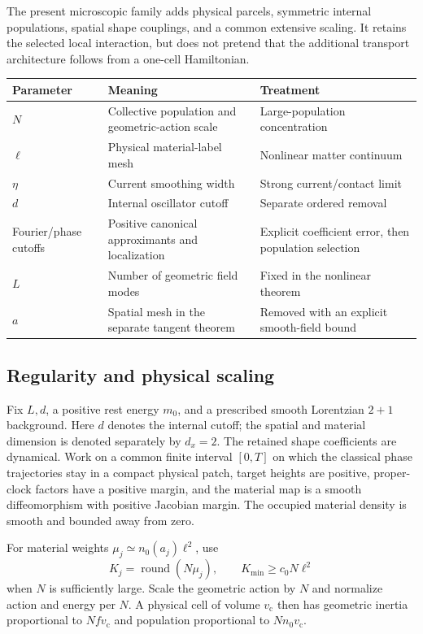 \documentclass[11pt]{article}
\begin{document}
The present microscopic family adds physical parcels, symmetric internal populations, spatial shape couplings, and a common extensive scaling. It retains the selected local interaction, but does not pretend that the additional transport architecture follows from a one-cell Hamiltonian.

\begin{center}\small
\begin{tabular}{@{}>{\raggedright\arraybackslash}p{}>{\raggedright\arraybackslash}p{}>{\raggedright\arraybackslash}p{}@{}}
\toprule
Parameter & Meaning & Treatment\\\midrule
$N$ & Collective population and geometric-action scale & Large-population concentration\\
$\ell$ & Physical material-label mesh & Nonlinear matter continuum\\
$\eta$ & Current smoothing width & Strong current/contact limit\\
$d$ & Internal oscillator cutoff & Separate ordered removal\\
Fourier/phase cutoffs & Positive canonical approximants and localization & Explicit coefficient error, then population selection\\
$L$ & Number of geometric field modes & Fixed in the nonlinear theorem\\
$a$ & Spatial mesh in the separate tangent theorem & Removed with an explicit smooth-field bound\\\bottomrule
\end{tabular}
\end{center}

\subsection{Regularity and physical scaling}
Fix $L,d$, a positive rest energy $m_0$, and a prescribed smooth Lorentzian $2+1$ background. Here $d$ denotes the internal cutoff; the spatial and material dimension is denoted separately by $d_x=2$. The retained shape coefficients are dynamical. Work on a common finite interval $[0,T]$ on which the classical phase trajectories stay in a compact physical patch, target heights are positive, proper-clock factors have a positive margin, and the material map is a smooth diffeomorphism with positive Jacobian margin. The occupied material density is smooth and bounded away from zero.

For material weights $\mu_j\simeq n_0(a_j)\ell^2$, use
\[
K_j=\operatorname{round}(N\mu_j),\qquad
K_{\min}\ge c_0N\ell^2
\]
when $N$ is sufficiently large. Scale the geometric action by $N$ and normalize action and energy per $N$. A physical cell of volume $v_{\mathrm c}$ then has geometric inertia proportional to $Nfv_{\mathrm c}$ and population proportional to $Nn_0v_{\mathrm c}$.
\end{document}
